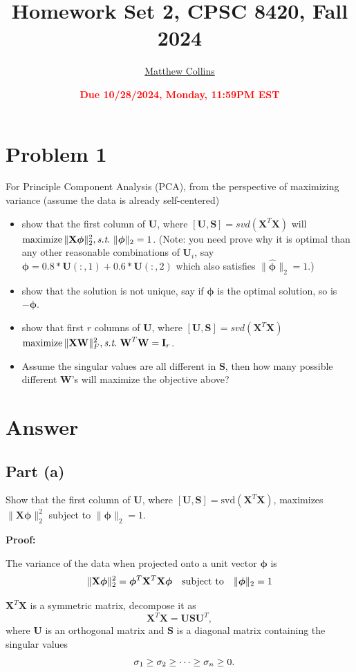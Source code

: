 \documentclass[11pt]{article}
\title{{\bf Homework Set 2, CPSC 8420, Fall 2024}} %
\author{\Large\underline{Matthew Collins}}
\date{\textbf{\Large\textcolor{red}{Due 10/28/2024, Monday, 11:59PM EST}}} %
\newcommand{\maximize}{\operatorname*{maximize}}
\newcommand{\mtx}[1]{\mathbf{#1}}
\def \mI {\mtx{I}}
\def \mU {\mtx{U}}
\def \mS {\mtx{S}}
\def \mW {\mtx{W}}
\def \mX {\mtx{X}}
\begin{document}
	\maketitle
	

	\section*{Problem 1}
	For Principle Component Analysis (PCA), from the perspective of maximizing variance (assume the data is already self-centered)
	\begin{itemize}
		\item show that the first column of $\mU$, where $[\mU,\mS]=svd(\mX^T\mX)$ will $\maximize \|\mX \bm{\phi}\|^2_2, \st \ \|\bm{\phi}\|_2=1$. (Note: you need prove why it is optimal than any other reasonable combinations of $\mU_i$, say $\hat{\bm{\phi}}=0.8*\mU(:,1)+0.6*\mU(:,2)$ which also  satisfies $\|\hat{\bm{\phi}}\|_2=1$.) 
		\item show that the solution is not unique, say if $\bm{\phi}$ is the optimal solution, so is $-\bm{\phi}$. 
		\item show that first $r$  columns of $\mU$, where $[\mU,\mS]=svd(\mX^T\mX)$ $\maximize \|\mX \bm{\mW}\|^2_F, \st \ \bm{\mW}^T\bm{\mW}=\mI_r$.
		\item Assume the singular values are all different in $\mS$, then how many possible different $\mW$'s will maximize the objective above?
	\end{itemize} 
	
	\section*{Answer}

\subsection*{Part (a)}
Show that the first column of $\mU$, where $[\mU, \mS] = \text{svd}(\mX^T \mX)$, maximizes $\|\mX \bm{\phi}\|_2^2$ subject to $\|\bm{\phi}\|_2 = 1$.

\textbf{Proof:}

The variance of the data when projected onto a unit vector $\bm{\phi}$ is
	\[
	\|\mX \bm{\phi}\|_2^2 = \bm{\phi}^T \mX^T \mX \bm{\phi} \hspace*{10pt} \text{subject to} \hspace*{10pt}\|\bm{\phi}\|_2 = 1
	\]


$\mX^T \mX$ is a symmetric matrix, decompose it as
   \[
   \mX^T \mX = \mU \mS \mU^T,
   \]
   \hspace*{15pt}where $\mU$ is an orthogonal matrix and $\mS$ is a diagonal matrix containing the singular values
   \[
   \hspace*{10pt}\sigma_1 \geq \sigma_2 \geq \dots \geq \sigma_n \geq 0.
   \]
   
\end{document}
